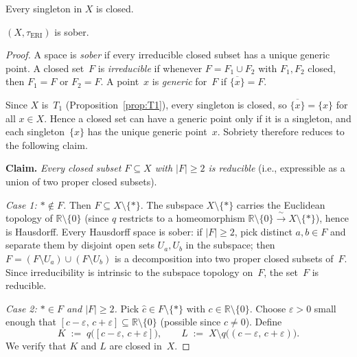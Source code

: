 \documentclass[10pt,a4paper]{amsart}
\begin{document}
\begin{proposition}[$X$ is $T_1$]\label{prop:T1}
Every singleton in $X$ is closed.
\end{proposition}

\begin{theorem}[Sobriety]\label{thm:sober}
$(X, \tau_{\mathrm{ERI}})$ is sober.
\end{theorem}

\begin{proof}
A space is \emph{sober} if every irreducible closed subset has a unique
generic point.  A closed set~$F$ is \emph{irreducible} if whenever
$F = F_1 \cup F_2$ with $F_1, F_2$ closed, then $F_1 = F$ or $F_2 = F$.
A point~$x$ is \emph{generic} for~$F$ if $\overline{\{x\}} = F$.

Since $X$ is~$T_1$ (Proposition~\ref{prop:T1}), every singleton is
closed, so $\overline{\{x\}} = \{x\}$ for all $x \in X$.  Hence a closed
set can have a generic point only if it is a singleton, and each
singleton~$\{x\}$ has the unique generic point~$x$.  Sobriety therefore
reduces to the following claim.

\medskip
\noindent\textbf{Claim.}\; \emph{Every closed subset $F \subseteq X$
with $|F| \geq 2$ is reducible} (i.e., expressible as a union of two
proper closed subsets).
\medskip

\noindent\emph{Case 1: $\ast \notin F$.}\;
Then $F \subseteq X \setminus \{\ast\}$.  The subspace
$X \setminus \{\ast\}$ carries the Euclidean topology of
$\mathbb{R}\setminus\{0\}$ (since $q$ restricts to a homeomorphism
$\mathbb{R}\setminus\{0\} \xrightarrow{\;\sim\;} X\setminus\{\ast\}$),
hence is Hausdorff.  Every Hausdorff space is sober: if $|F| \geq 2$,
pick distinct $a, b \in F$ and separate them by disjoint open sets
$U_a, U_b$ in the subspace; then $F = (F \setminus U_a) \cup (F \setminus U_b)$
is a decomposition into two proper closed subsets of~$F$.
Since irreducibility is intrinsic to the subspace topology on~$F$,
the set~$F$ is reducible.

\smallskip
\noindent\emph{Case 2: $\ast \in F$ and $|F| \geq 2$.}\;
Pick $\hat{c} \in F \setminus \{\ast\}$ with
$c \in \mathbb{R}\setminus\{0\}$.  Choose $\varepsilon > 0$ small
enough that $[c - \varepsilon,\, c + \varepsilon] \subseteq
\mathbb{R}\setminus\{0\}$ (possible since $c \neq 0$).  Define
\[
  K \;:=\; q\bigl([c-\varepsilon,\, c+\varepsilon]\bigr),
  \qquad
  L \;:=\; X \setminus q\bigl((c-\varepsilon,\, c+\varepsilon)\bigr).
\]
We verify that $K$ and $L$ are closed in~$X$.


\end{proof}
\end{document}
